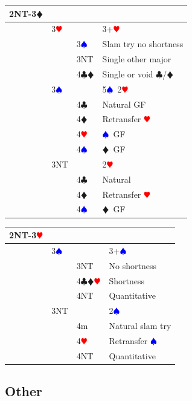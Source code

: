 \documentclass[a4paper]{article}
\newcommand{\BC}{\textcolor{OliveGreen}{$\clubsuit$}}
\newcommand{\BD}{\textcolor{RedOrange}{$\vardiamondsuit$}}
\newcommand{\BH}{\textcolor{Red}{$\varheartsuit${}}}
\newcommand{\BS}{\textcolor{Blue}{$\spadesuit${}}}
\begin{document}
\begingroup
\renewcommand{\arraystretch}{1.4}
\begin{xltabular}{\linewidth}{|l|l|l|X|}
\hline
2NT-3\BD &  &  &  \\
\hline
 & 3\BH &  & 3+\BH \\
\hline
 &  & 3\BS & Slam try no shortness \\
\hline
 &  & 3NT & Single other major \\
\hline
 &  & 4\BC\BD & Single or void \BC /\BD \\
\hline
 & 3\BS &  & 5\BS\ 2\BH \\
\hline
 &  & 4\BC & Natural GF \\
\hline
 &  & 4\BD & Retransfer \BH \\
\hline
 &  & 4\BH & \BS\ GF \\
\hline
 &  & 4\BS & \BD\ GF \\
\hline
 & 3NT &  & 2\BH \\
\hline
 &  & 4\BC & Natural \\
\hline
 &  & 4\BD & Retransfer \BH \\
\hline
 &  & 4\BS & \BD\ GF \\
\hline
\end{xltabular}
\endgroup
\bigbreak
\begingroup
\renewcommand{\arraystretch}{1.4}
\begin{xltabular}{\linewidth}{|l|l|l|X|}
\hline
2NT-3\BH &  &  &  \\
\hline
 & 3\BS &  & 3+\BS \\
\hline
 &  & 3NT & No shortness \\
\hline
 &  & 4\BC\BD\BH & Shortness \\
\hline
 &  & 4NT & Quantitative \\
\hline
 & 3NT &  & 2\BS \\
\hline
 &  & 4m & Natural slam try \\
\hline
 &  & 4\BH & Retransfer \BS \\
\hline
 &  & 4NT & Quantitative \\
\hline
\end{xltabular}
\endgroup
\bigbreak
\subsection{Other}
\end{document}
